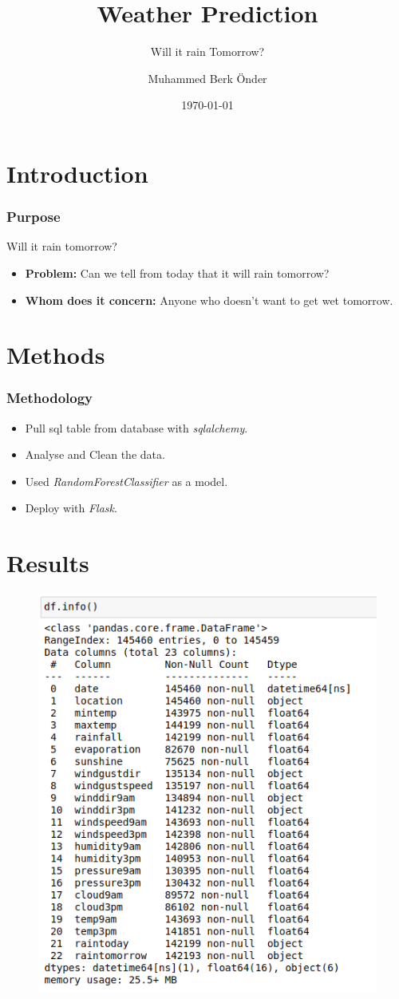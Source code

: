 \documentclass{beamer}
\title{Weather Prediction}
\subtitle{Will it rain Tomorrow?}
\author{Muhammed Berk Önder}
\institute{İstanbul Data Science Academy}
\date{\today}
\begin{document}
\begin{frame}[plain]
    \maketitle

\end{frame}

\section{Introduction}
\begin{frame}[plain]
    \frametitle{Purpose}
    \LARGE{Will it rain tomorrow?}
    \normalsize
    \bigskip
    \begin{itemize}
        \item \textbf{Problem:} Can we tell from today that it will rain tomorrow? 
        \bigskip
        \item \textbf{Whom does it concern:} Anyone who doesn't want to get wet tomorrow.
    \end{itemize}
\end{frame}

\section{Methods}
\begin{frame}[plain]
    \frametitle{Methodology}
    \large
    \begin{itemize}
        \item Pull sql table from database with \textit{sqlalchemy}.
        \bigskip
        \item Analyse and Clean the data.
        \bigskip
        \item Used \textit{RandomForestClassifier} as a model.
        \bigskip
        \item Deploy with \textit{Flask}.
    \end{itemize}
\end{frame}

\section{Results}
\begin{frame}[plain]
    \begin{figure}
        \includegraphics[width=.5\textwidth]{images/info.png}
    \end{figure}
\end{frame}
\end{document}
